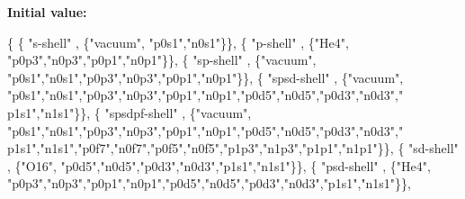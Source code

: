 {\bfseries Initial value\+:}
\begin{DoxyCode}
\{
\{ \textcolor{stringliteral}{"s-shell"}  ,         \{\textcolor{stringliteral}{"vacuum"}, \textcolor{stringliteral}{"p0s1"},\textcolor{stringliteral}{"n0s1"}\}\},
\{ \textcolor{stringliteral}{"p-shell"}  ,         \{\textcolor{stringliteral}{"He4"}, \textcolor{stringliteral}{"p0p3"},\textcolor{stringliteral}{"n0p3"},\textcolor{stringliteral}{"p0p1"},\textcolor{stringliteral}{"n0p1"}\}\},
\{ \textcolor{stringliteral}{"sp-shell"}  ,        \{\textcolor{stringliteral}{"vacuum"}, \textcolor{stringliteral}{"p0s1"},\textcolor{stringliteral}{"n0s1"},\textcolor{stringliteral}{"p0p3"},\textcolor{stringliteral}{"n0p3"},\textcolor{stringliteral}{"p0p1"},\textcolor{stringliteral}{"n0p1"}\}\},
\{ \textcolor{stringliteral}{"spsd-shell"}  ,      \{\textcolor{stringliteral}{"vacuum"}, \textcolor{stringliteral}{"p0s1"},\textcolor{stringliteral}{"n0s1"},\textcolor{stringliteral}{"p0p3"},\textcolor{stringliteral}{"n0p3"},\textcolor{stringliteral}{"p0p1"},\textcolor{stringliteral}{"n0p1"},\textcolor{stringliteral}{"p0d5"},\textcolor{stringliteral}{"n0d5"},\textcolor{stringliteral}{"p0d3"},\textcolor{stringliteral}{"n0d3"},\textcolor{stringliteral}{"
      p1s1"},\textcolor{stringliteral}{"n1s1"}\}\},
\{ \textcolor{stringliteral}{"spsdpf-shell"}  ,    \{\textcolor{stringliteral}{"vacuum"}, \textcolor{stringliteral}{"p0s1"},\textcolor{stringliteral}{"n0s1"},\textcolor{stringliteral}{"p0p3"},\textcolor{stringliteral}{"n0p3"},\textcolor{stringliteral}{"p0p1"},\textcolor{stringliteral}{"n0p1"},\textcolor{stringliteral}{"p0d5"},\textcolor{stringliteral}{"n0d5"},\textcolor{stringliteral}{"p0d3"},\textcolor{stringliteral}{"n0d3"},\textcolor{stringliteral}{"
      p1s1"},\textcolor{stringliteral}{"n1s1"},\textcolor{stringliteral}{"p0f7"},\textcolor{stringliteral}{"n0f7"},\textcolor{stringliteral}{"p0f5"},\textcolor{stringliteral}{"n0f5"},\textcolor{stringliteral}{"p1p3"},\textcolor{stringliteral}{"n1p3"},\textcolor{stringliteral}{"p1p1"},\textcolor{stringliteral}{"n1p1"}\}\},
\{ \textcolor{stringliteral}{"sd-shell"}  ,        \{\textcolor{stringliteral}{"O16"}, \textcolor{stringliteral}{"p0d5"},\textcolor{stringliteral}{"n0d5"},\textcolor{stringliteral}{"p0d3"},\textcolor{stringliteral}{"n0d3"},\textcolor{stringliteral}{"p1s1"},\textcolor{stringliteral}{"n1s1"}\}\},
\{ \textcolor{stringliteral}{"psd-shell"}  ,       \{\textcolor{stringliteral}{"He4"}, \textcolor{stringliteral}{"p0p3"},\textcolor{stringliteral}{"n0p3"},\textcolor{stringliteral}{"p0p1"},\textcolor{stringliteral}{"n0p1"},\textcolor{stringliteral}{"p0d5"},\textcolor{stringliteral}{"n0d5"},\textcolor{stringliteral}{"p0d3"},\textcolor{stringliteral}{"n0d3"},\textcolor{stringliteral}{"p1s1"},\textcolor{stringliteral}{"n1s1"}\}\},

\end{DoxyCode}
